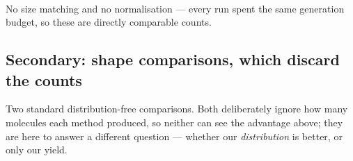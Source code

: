 \documentclass[11pt]{article}
\begin{document}
\begin{table}[htbp]
\centering
\footnotesize
\setlength{\tabcolsep}{4pt}
\\[0.4em] \begin{minipage}{0.92\textwidth}\footnotesize No size matching and no normalisation --- every run spent the same generation budget, so these are directly comparable counts.\end{minipage}
\caption{Novel molecules clearing each ring count bar, out of the 1{,}024 sequences each run generated. The two mixture-sampling modes are kept apart rather than merged into a single \emph{ours} row, since they are different samplers. Each is at its own best setting, ranked on the middle bar; the multiplier is against D-CBG on the same model.}
\label{tab:hits-ring_count}
\end{table}


\subsection{Secondary: shape comparisons, which discard the counts}

Two standard distribution-free comparisons. Both deliberately ignore how many
molecules each method produced, so neither can see the advantage above; they are
here to answer a different question --- whether our \emph{distribution} is
better, or only our yield.
\end{document}
